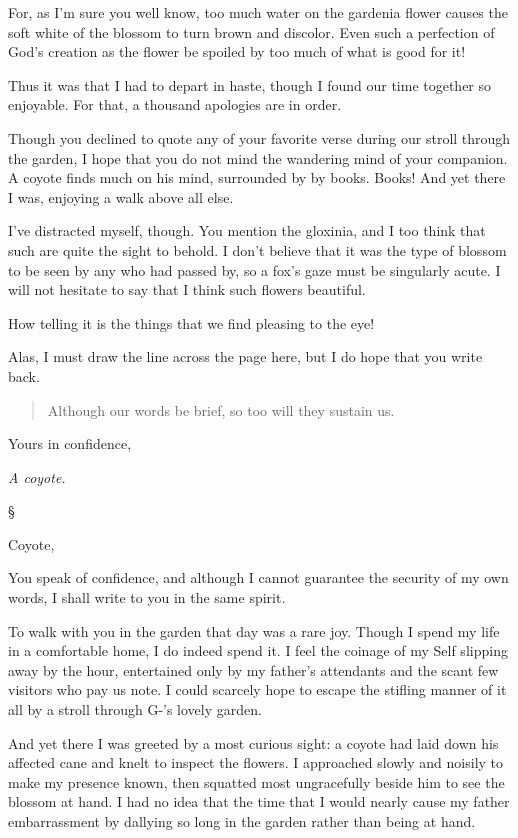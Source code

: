 \documentclass[12pt,letterpaper,oneside]{memoir}
\newcommand\secdiv{
  \begin{center}
    \S
  \end{center}
}
\begin{document}
  For, as I'm sure you well know, too much water on the gardenia flower
  causes the soft white of the blossom to turn brown and discolor. Even
  such a perfection of God's creation as the flower be spoiled by too much
  of what is good for it!

  Thus it was that I had to depart in haste, though I found our time
  together so enjoyable. For that, a thousand apologies are in order.

  Though you declined to quote any of your favorite verse during our
  stroll through the garden, I hope that you do not mind the wandering
  mind of your companion. A coyote finds much on his mind, surrounded by
  by books. Books! And yet there I was, enjoying a walk above all else.

  I've distracted myself, though. You mention the gloxinia, and I too
  think that such are quite the sight to behold. I don't believe that it
  was the type of blossom to be seen by any who had passed by, so a fox's
  gaze must be singularly acute. I will not hesitate to say that I think
  such flowers beautiful.

  How telling it is the things that we find pleasing to the eye!

  Alas, I must draw the line across the page here, but I do hope that you
  write back.

  \begin{quote}
  Although our words be brief, so too will they sustain us.
  \end{quote}

  Yours in confidence,

  \emph{A coyote.}

  \secdiv

  Coyote,

  You speak of confidence, and although I cannot guarantee the security of
  my own words, I shall write to you in the same spirit.

  To walk with you in the garden that day was a rare joy. Though I spend
  my life in a comfortable home, I do indeed spend it. I feel the coinage
  of my Self slipping away by the hour, entertained only by my father's
  attendants and the scant few visitors who pay us note. I could scarcely
  hope to escape the stifling manner of it all by a stroll through G-'s
  lovely garden.

  And yet there I was greeted by a most curious sight: a coyote had laid
  down his affected cane and knelt to inspect the flowers. I approached
  slowly and noisily to make my presence known, then squatted most
  ungracefully beside him to see the blossom at hand. I had no idea that
  the time that I would nearly cause my father embarrassment by dallying
  so long in the garden rather than being at hand.
\end{document}
